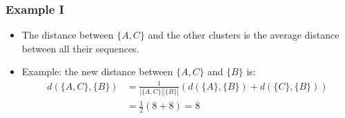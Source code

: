 \documentclass[usenames,dvipsnames,xcolor=table]{beamer}
\begin{document}
\begin{frame}[fragile]
  \frametitle{Example I}
	\begin{itemize}
		\item The distance between $\{A,C\}$ and the other clusters is the \textcolor{ALUred}{average distance between all their sequences}.
		\item Example: the new distance between $\{A,C\}$ and $\{B\}$ is:
    \scriptsize
		\begin{align*}
			d(\{A,C\}, \{B\}) &= \frac{1}{|\{A,C\}||\{B\}|}  (d(\{A\},\{B\}) + d(\{C\},\{B\}))\\
			                  &= \frac{1}{2} (8+8) = 8
		\end{align*}
	\end{itemize}
  \begin{columns}


\end{columns}
\end{frame}
\end{document}
